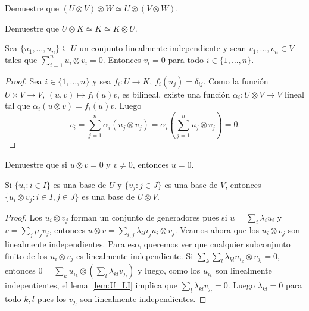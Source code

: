 \begin{exercise}
	\label{xca:UxVxW}
	Demuestre que $(U\otimes V)\otimes W\simeq U\otimes(V\otimes W)$.
\end{exercise}

\begin{exercise}
	\label{xca:UxK}
	Demuestre que $U\otimes K\simeq K\simeq K\otimes U$.
\end{exercise}

\begin{lemma}
	\label{lem:U_LI}
	Sea $\{u_1,\dots,u_n\}\subseteq U$ un conjunto linealmente independiente y
	sean $v_1,\dots,v_n\in V$ tales que $\sum_{i=1}^n u_i\otimes v_i=0$.
	Entonces $v_i=0$ para todo $i\in\{1,\dots,n\}$.
\end{lemma}

\begin{proof}
	Sea $i\in\{1,\dots,n\}$ y sea $f_i\colon U\to K$, $f_i(u_j)=\delta_{ij}$.
	Como la función $U\times V\to V$, $(u,v)\mapsto f_i(u)v$, es bilineal, existe una función
	$\alpha_i\colon U\otimes V\to V$ lineal tal que $\alpha_i(u\otimes
	v)=f_i(u)v$. Luego
	\[
		v_i=\sum_{j=1}^n\alpha_i(u_j\otimes v_j)=\alpha_i\left(\sum_{j=1}^nu_j\otimes v_j\right)=0.
	\]
\end{proof}

\begin{exercise}
	\label{xca:uxv=0}
	Demuestre que si $u\otimes v=0$ y $v\ne 0$, entonces $u=0$.
\end{exercise}

\begin{theorem}
	Si $\{u_i:i\in I\}$ es una base de $U$ y $\{v_j:j\in J\}$ es una base de
	$V$, entonces $\{u_i\otimes v_j:i\in I,j\in J\}$ es una base de $U\otimes
	V$.
\end{theorem}

\begin{proof}
	Los $u_i\otimes v_j$ forman un conjunto de generadores pues  
	si $u=\sum_i\lambda_iu_i$ y $v=\sum_j\mu_jv_j$, entonces
	$u\otimes v=\sum_{i,j}\lambda_i\mu_ju_i\otimes v_j$. 
	Veamos ahora que los $u_i\otimes v_j$ son linealmente independientes. Para
	eso, queremos ver que cualquier subconjunto finito de los $u_i\otimes v_j$
	es linealmente independiente. Si $\sum_k\sum_l\lambda_{kl}u_{i_k}\otimes
	v_{j_l}=0$, entonces
	$0=\sum_{k}u_{i_k}\otimes\left(\sum_{l}\lambda_{kl}v_{j_l}\right)$ y luego,
	como los $u_{i_k}$ son linealmente indepentientes, el lema~\ref{lem:U_LI}
	implica que $\sum_{l}\lambda_{kl}v_{j_l}=0$. Luego $\lambda_{kl}=0$ para
	todo $k,l$ pues los $v_{j_l}$ son linealmente independientes.
\end{proof}

